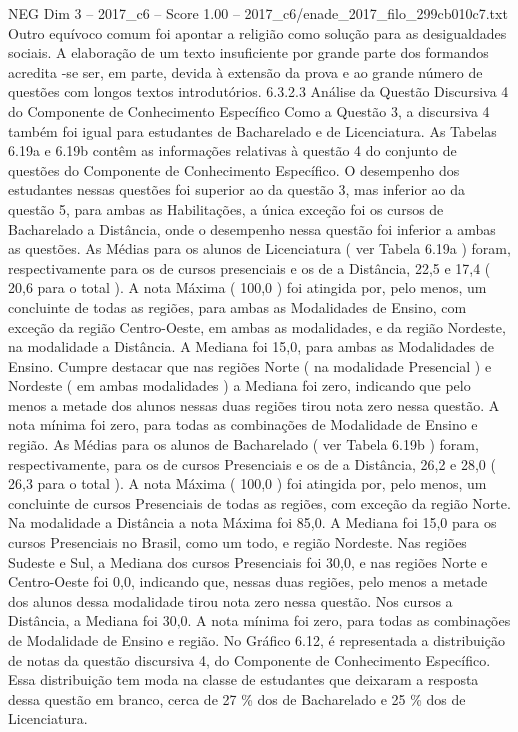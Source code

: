 \begin{textsample}{NEG Dim 3 – 2017\_c6 – Score 1.00 – 2017\_c6/enade\_2017\_filo\_299cb010c7.txt}
Outro equívoco comum foi apontar a religião como solução para as desigualdades sociais.
A elaboração de um texto insuficiente por grande parte dos formandos acredita -se ser, em parte, devida à extensão da prova e ao grande número de questões com longos textos introdutórios. 6.3.2.3 Análise da Questão Discursiva 4 do Componente de Conhecimento Específico Como a Questão 3, a discursiva 4 também foi igual para estudantes de Bacharelado e de Licenciatura.
As Tabelas 6.19a e 6.19b contêm as informações relativas à questão 4 do conjunto de questões do Componente de Conhecimento Específico.
O desempenho dos estudantes nessas questões foi superior ao da questão 3, mas inferior ao da questão 5, para ambas as Habilitações, a única exceção foi os cursos de Bacharelado a Distância, onde o desempenho nessa questão foi inferior a ambas as questões.
As Médias para os alunos de Licenciatura ( ver Tabela 6.19a ) foram, respectivamente para os de cursos presenciais e os de a Distância, 22,5 e 17,4 ( 20,6 para o total ).
A nota Máxima ( 100,0 ) foi atingida por, pelo menos, um concluinte de todas as regiões, para ambas as Modalidades de Ensino, com exceção da região Centro-Oeste, em ambas as modalidades, e da região Nordeste, na modalidade a Distância.
A Mediana foi 15,0, para ambas as Modalidades de Ensino.
Cumpre destacar que nas regiões Norte ( na modalidade Presencial ) e Nordeste ( em ambas modalidades ) a Mediana foi zero, indicando que pelo menos a metade dos alunos nessas duas regiões tirou nota zero nessa questão.
A nota mínima foi zero, para todas as combinações de Modalidade de Ensino e região.
As Médias para os alunos de Bacharelado ( ver Tabela 6.19b ) foram, respectivamente, para os de cursos Presenciais e os de a Distância, 26,2 e 28,0 ( 26,3 para o total ).
A nota Máxima ( 100,0 ) foi atingida por, pelo menos, um concluinte de cursos Presenciais de todas as regiões, com exceção da região Norte.
Na modalidade a Distância a nota Máxima foi 85,0.
A Mediana foi 15,0 para os cursos Presenciais no Brasil, como um todo, e região Nordeste.
Nas regiões Sudeste e Sul, a Mediana dos cursos Presenciais foi 30,0, e nas regiões Norte e Centro-Oeste foi 0,0, indicando que, nessas duas regiões, pelo menos a metade dos alunos dessa modalidade tirou nota zero nessa questão.
Nos cursos a Distância, a Mediana foi 30,0.
A nota mínima foi zero, para todas as combinações de Modalidade de Ensino e região.
No Gráfico 6.12, é representada a distribuição de notas da questão discursiva 4, do Componente de Conhecimento Específico.
Essa distribuição tem moda na classe de estudantes que deixaram a resposta dessa questão em branco, cerca de 27 \% dos de Bacharelado e 25 \% dos de Licenciatura.

\end{textsample}
